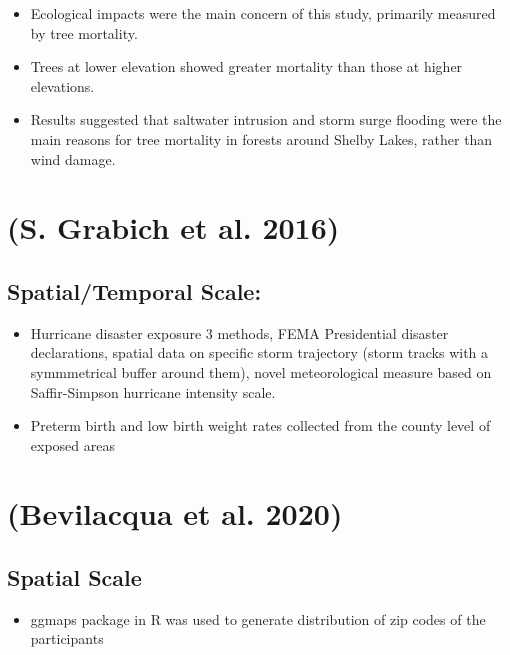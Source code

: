 \documentclass[
]{article}
\providecommand{\tightlist}{%
  \setlength{\itemsep}{0pt}\setlength{\parskip}{0pt}}
\begin{document}
\begin{itemize}
\tightlist
\item
  Ecological impacts were the main concern of this study, primarily
  measured by tree mortality.
\item
  Trees at lower elevation showed greater mortality than those at higher
  elevations.
\item
  Results suggested that saltwater intrusion and storm surge flooding
  were the main reasons for tree mortality in forests around Shelby
  Lakes, rather than wind damage.
\end{itemize}

\hypertarget{grabich2016measuring}{%
\section{(S. Grabich et al. 2016)}\label{grabich2016measuring}}

\hypertarget{spatialtemporal-scale}{%
\subsection{Spatial/Temporal Scale:}\label{spatialtemporal-scale}}

\begin{itemize}
\tightlist
\item
  Hurricane disaster exposure 3 methods, FEMA Presidential disaster
  declarations, spatial data on specific storm trajectory (storm tracks
  with a symmmetrical buffer around them), novel meteorological measure
  based on Saffir-Simpson hurricane intensity scale.
\item
  Preterm birth and low birth weight rates collected from the county
  level of exposed areas
\end{itemize}

\hypertarget{bevilacqua2020understanding}{%
\section{(Bevilacqua et al. 2020)}\label{bevilacqua2020understanding}}

\hypertarget{spatial-scale-5}{%
\subsection{Spatial Scale}\label{spatial-scale-5}}

\begin{itemize}
\tightlist
\item
  ggmaps package in R was used to generate distribution of zip codes of
  the participants
\end{itemize}
\end{document}
